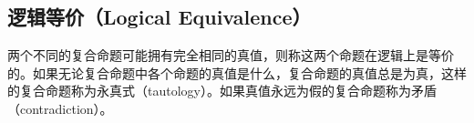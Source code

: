 \begin{table}[H]
    \centering
    \caption{双向蕴含真值表}
\end{table}

\vspace{0.5cm}

\subsection{逻辑等价（Logical Equivalence）}

两个不同的复合命题可能拥有完全相同的真值，则称这两个命题在逻辑上是等价的。如果无论复合命题中各个命题的真值是什么，复合命题的真值总是为真，这样的复合命题称为永真式（tautology）。如果真值永远为假的复合命题称为矛盾（contradiction）。

\begin{table}[H]
    \centering
    \caption{逻辑等价}
\end{table}

